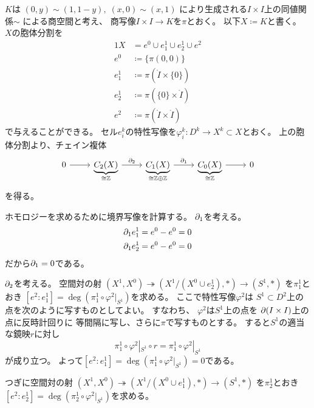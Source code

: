 \documentclass[report]{jlreq}
\begin{document}
\begin{answer}
    $K$は
    $(0, y) \sim (1, 1 - y), \; (x, 0) \sim (x, 1)$
    により生成される$I \times I$上の同値関係$\sim$
    による商空間と考え、
    商写像$I \times I \to K$を$\pi$とおく。
    以下$X \coloneqq K$と書く。
    $X$の胞体分割を
    \begin{alignat}{1}
        X &= e^0 \cup e^1_1 \cup e^1_2 \cup e^2 \\
        e^0 &\coloneqq \{ \pi(0, 0) \} \\
        e^1_1 &\coloneqq \pi(\mathring{I} \times \{ 0 \}) \\
        e^1_2 &\coloneqq \pi(\{ 0 \} \times \mathring{I}) \\
        e^2 &\coloneqq \pi(\mathring{I} \times \mathring{I})
    \end{alignat}
    で与えることができる。
    セル$e^k_i$の特性写像を$\varphi^k_i \colon D^k \to X^k \subset X$とおく。
    上の胞体分割より、チェイン複体
    \begin{equation}
        \begin{tikzcd}
            0
                \ar{r}
                & \underbrace{C_2(X)}_{
                    \cong \Z
                }
                    \ar{r}{\del_2}
                & \underbrace{C_1(X)}_{
                    \cong \Z \oplus \Z
                }
                    \ar{r}{\del_1}
                & \underbrace{C_0(X)}_{
                    \cong \Z
                }
                    \ar{r}
                & 0
        \end{tikzcd}
    \end{equation}
    を得る。

    ホモロジーを求めるために境界写像を計算する。
    $\partial_1$を考える。
    \begin{alignat}{1}
        \partial_1 e^1_1 &= e^0 - e^0 = 0 \\
        \partial_1 e^1_2 &= e^0 - e^0 = 0
    \end{alignat}
    だから$\partial_1 = 0$である。

    $\partial_2$を考える。
    空間対の射
    $(X^1, X^0) \twoheadrightarrow (X^1 / (X^0 \cup e^1_2), *) \to (S^1, *)$
    を$\pi^1_1$とおき
    $[e^2 : e^1_1] = \deg (\pi^1_1 \circ \varphi^2|_{S^1})$を求める。
    ここで特性写像$\varphi^2$は
    $S^1 \subset D^2$上の点を次のように写すものとしてよい。
    すなわち、
    $\varphi^2$は$S^1$上の点を
    $\partial (I \times I)$上の点に反時計回りに
    等間隔に写し、さらに$\pi$で写すものとする。
    すると$S^1$の適当な鏡映$r$に対し
    \begin{equation}
        \pi^1_1 \circ \varphi^2|_{S^1} \circ r
            = \pi^1_1 \circ \varphi^2|_{S^1}
    \end{equation}
    が成り立つ。
    よって$[e^2 : e^1_1] = \deg (\pi^1_1 \circ \varphi^2|_{S^1}) = 0$である。

    つぎに空間対の射
    $(X^1, X^0) \twoheadrightarrow (X^1 / (X^0 \cup e^1_1), *) \to (S^1, *)$
    を$\pi^1_2$とおき
    $[e^2 : e^1_2] = \deg (\pi^1_2 \circ \varphi^2|_{S^1})$を求める。
\end{answer}
\end{document}
